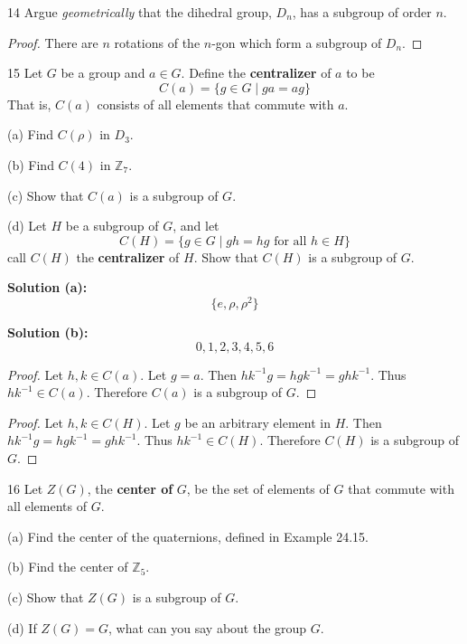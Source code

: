\begin{problem}{14}
    Argue \emph{geometrically} that the dihedral group, $D_n$,
    has a subgroup of order $n$.
\end{problem}
\solved

\begin{proof}
    There are $n$ rotations of the $n$-gon which form a subgroup of $D_n$.
\end{proof}

\begin{problem}{15}
    Let $G$ be a group and $a \in G$. Define the \textbf{centralizer}
    of $a$ to be 
    \[C(a) = \{g \in G \mid ga = ag\}\]
    That is, $C(a)$ consists of all elements that commute with $a$.

    (a) Find $C(\rho)$ in $D_3$.

    (b) Find $C(4)$ in $\mathbb{Z}_7$.

    (c) Show that $C(a)$ is a subgroup of $G$.

    (d) Let $H$ be a subgroup of $G$, and let 
        \[C(H) = \{g \in G \mid gh = hg \text{ for all } h \in H\}\]
        call $C(H)$ the \textbf{centralizer} of $H$. 
        Show that $C(H)$ is a subgroup of $G$.
\end{problem}
\solved

\textbf{Solution (a):}
\[\{e,\rho,\rho^2\}\]

\textbf{Solution (b):}
\[0, 1, 2, 3, 4, 5, 6\]

\begin{proof}
    Let $h, k \in C(a)$.
    Let $g = a$.
    Then $hk^{-1}g = hgk^{-1} = gh k^{-1}$.
    Thus $h k^{-1} \in C(a)$.
    Therefore $C(a)$ is a subgroup of $G$.
\end{proof}

\begin{proof}
    Let $h, k \in C(H)$.
    Let $g$ be an arbitrary element in $H$.
    Then $hk^{-1}g = hgk^{-1} = gh k^{-1}$.
    Thus $h k^{-1} \in C(H)$.
    Therefore $C(H)$ is a subgroup of $G$.
\end{proof}

\begin{problem}{16}
    Let $Z(G)$, the \textbf{center of} $G$, be the set of elements of $G$
        that commute with all elements of $G$.

    (a) Find the center of the quaternions, defined in Example 24.15.

    (b) Find the center of $\mathbb{Z}_5$.

    (c) Show that $Z(G)$ is a subgroup of $G$.

    (d) If $Z(G) = G$, what can you say about the group $G$.
\end{problem}
\unsolved


